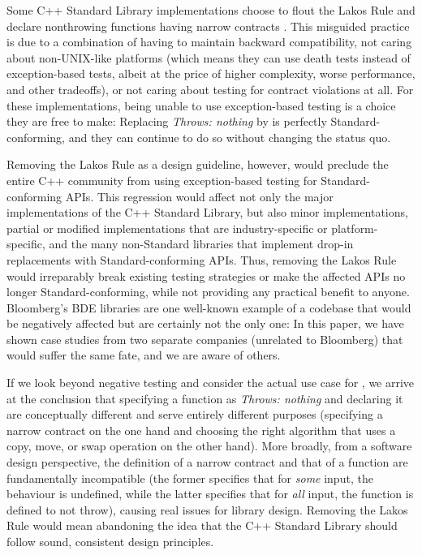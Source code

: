 Some C++ Standard Library implementations choose to flout the Lakos Rule and declare nonthrowing functions having narrow contracts . This misguided practice is due to a combination of having to maintain backward compatibility, not caring about non-UNIX-like platforms (which means they can use death tests instead of exception-based tests, albeit at the price of higher complexity, worse performance, and other tradeoffs), or not caring about testing for contract violations at all. For these implementations, being unable to use exception-based testing is a choice they are free to make: Replacing \emph{Throws: nothing} by  is perfectly Standard-conforming, and they can continue to do so without changing the status quo.

Removing the Lakos Rule as a design guideline, however, would preclude the entire C++ community from using exception-based testing for Standard-conforming APIs. This regression would affect not only the major implementations of the C++ Standard Library, but also minor implementations, partial or modified implementations that are industry-specific or platform-specific, and the many non-Standard libraries that implement drop-in replacements with Standard-conforming APIs. Thus, removing the Lakos Rule would irreparably break existing testing strategies or make the affected APIs no longer Standard-conforming, while not providing any practical benefit to anyone. Bloomberg's BDE libraries are one well-known example of a codebase that would be negatively affected but are certainly not the only one: In this paper, we have shown case studies from two separate companies (unrelated to Bloomberg) that would suffer the same fate, and we are aware of others.

If we look beyond negative testing and consider the actual use case for , we arrive at the conclusion that specifying a function as \emph{Throws: nothing} and declaring it  are conceptually different and serve entirely different purposes (specifying a narrow contract on the one hand and choosing the right algorithm that uses a copy, move, or swap operation on the other hand). More broadly, from a software design perspective, the definition of a narrow contract and that of a  function are fundamentally incompatible (the former specifies that for \emph{some} input, the behaviour is undefined, while the latter specifies that for \emph{all} input, the function is defined to not throw), causing real issues for library design. Removing the Lakos Rule would mean abandoning the idea that the C++ Standard Library should follow sound, consistent design principles.

